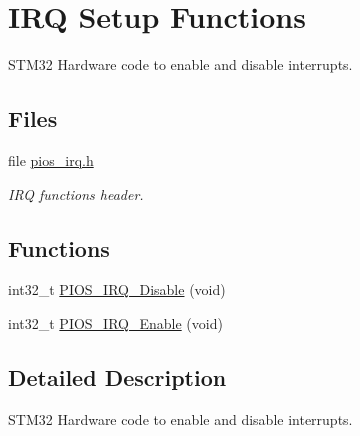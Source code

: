\hypertarget{group___p_i_o_s___i_r_q}{\section{\-I\-R\-Q \-Setup \-Functions}
\label{group___p_i_o_s___i_r_q}
}


\-S\-T\-M32 \-Hardware code to enable and disable interrupts.  


\subsection*{\-Files}
\begin{DoxyCompactItemize}
\item 
file \hyperlink{pios__irq_8h}{pios\-\_\-irq.\-h}
\begin{DoxyCompactList}\small\item\em \-I\-R\-Q functions header. \end{DoxyCompactList}\end{DoxyCompactItemize}
\subsection*{\-Functions}
\begin{DoxyCompactItemize}
\item 
int32\-\_\-t \hyperlink{group___p_i_o_s___i_r_q_ga3282c57027468fb75bf7026c186e2906}{\-P\-I\-O\-S\-\_\-\-I\-R\-Q\-\_\-\-Disable} (void)
\item 
int32\-\_\-t \hyperlink{group___p_i_o_s___i_r_q_ga5662158f04cd1f3772b35899a6eb21bb}{\-P\-I\-O\-S\-\_\-\-I\-R\-Q\-\_\-\-Enable} (void)
\end{DoxyCompactItemize}


\subsection{\-Detailed \-Description}
\-S\-T\-M32 \-Hardware code to enable and disable interrupts. 

